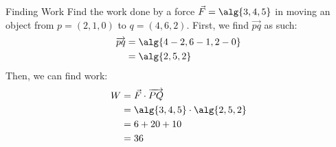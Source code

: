 \documentclass[12pt]{report}
\begin{document}
\begin{exbox}{Finding Work}{}
    Find the work done by a force $\vec{F} = \alg{3,4,5}$ in moving an object from $p = (2,1,0)$ to $q = (4,6,2)$.
    \tcblower
    First, we find $\overrightarrow{pq}$ as such:
    \begin{align*}
        \overrightarrow{pq}
        &= \alg{4-2, 6-1, 2-0} \\
        &= \alg{2,5,2}
    \end{align*}
    Then, we can find work:
    \begin{align*}
        W
        &= \vec{F} \cdot \overrightarrow{PQ} \\
        &= \alg{3,4,5} \cdot \alg{2,5,2} \\
        &= 6 + 20 + 10 \\
        &= 36
    \end{align*}
\end{exbox}

\makeamzindex
\end{document}
